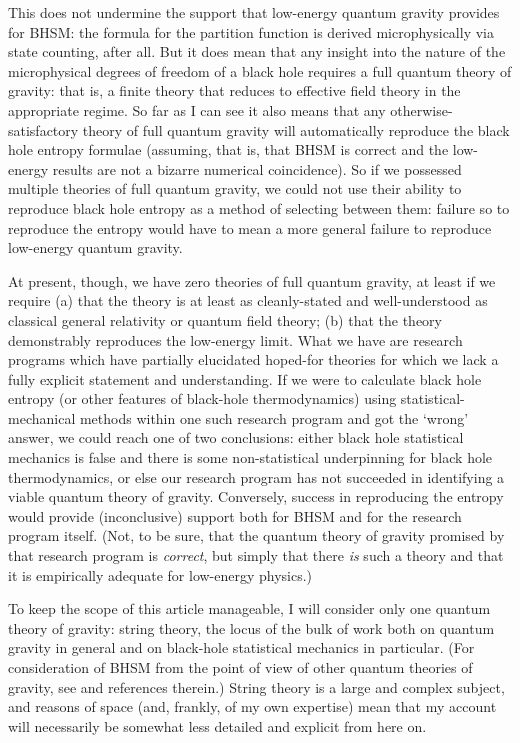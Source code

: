 \documentclass{article}
\begin{document}
This does not undermine the support that low-energy quantum gravity provides for BHSM: the formula for the partition function is derived microphysically via state counting, after all. But it does mean that any insight into the nature of the microphysical degrees of freedom of a black hole requires a full quantum theory of gravity: that is, a finite theory that reduces to effective field theory in the appropriate regime. So far as I can see it also means that any otherwise-satisfactory theory of full quantum gravity will automatically reproduce the black hole entropy formulae (assuming, that is, that BHSM is correct and the low-energy results are not a bizarre numerical coincidence). So if we possessed multiple theories of full quantum gravity, we could not use their ability to reproduce black hole entropy as a method of selecting between them: failure so to reproduce the entropy would have to mean a more general failure to reproduce low-energy quantum gravity.

At present, though, we have zero theories of full quantum gravity, at least if we require (a) that the theory is at least as cleanly-stated and well-understood as classical general relativity or quantum field theory; (b) that the theory demonstrably reproduces the low-energy limit. What we have are research programs which have partially elucidated hoped-for theories for which we lack a fully explicit statement and understanding.  If we were to calculate black hole entropy (or other features of black-hole thermodynamics) using statistical-mechanical methods within one such research program and got the `wrong' answer, we could reach one of two conclusions: either black hole statistical mechanics is false and there is some non-statistical underpinning for black hole thermodynamics, or else our research program has not succeeded in identifying a viable quantum theory of gravity. Conversely, success in reproducing the entropy would provide (inconclusive) support both for BHSM and for the research program itself. (Not, to be sure, that the quantum theory of gravity promised by that research program is \emph{correct}, but simply that there \emph{is} such a theory and that it is empirically adequate for low-energy physics.)

To keep the scope of this article manageable, I will consider only one quantum theory of gravity: string theory, the locus of the bulk of work both on quantum gravity in general and on black-hole statistical mechanics in particular. (For consideration of BHSM from the point of view of other quantum theories of gravity, see  and references therein.) String theory is a large and complex subject, and reasons of space (and, frankly, of my own expertise) mean that my account will necessarily be somewhat less detailed and explicit from here on.
\end{document}
